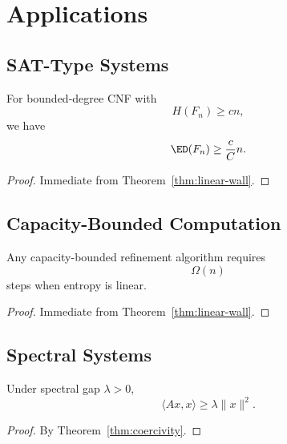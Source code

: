 \chapter{Applications}

\section{SAT-Type Systems}

\begin{theorem}
For bounded-degree CNF with
\[
H(F_n) \ge c n,
\]
we have
\[
\ED(F_n) \ge \frac{c}{C} n.
\]
\end{theorem}

\begin{proof}
Immediate from Theorem~\ref{thm:linear-wall}.
\end{proof}

\section{Capacity-Bounded Computation}

\begin{theorem}
Any capacity-bounded refinement algorithm requires
\[
\Omega(n)
\]
steps when entropy is linear.
\end{theorem}

\begin{proof}
Immediate from Theorem~\ref{thm:linear-wall}.
\end{proof}

\section{Spectral Systems}

\begin{theorem}
Under spectral gap $\lambda>0$,
\[
\langle Ax,x\rangle \ge \lambda \|x\|^2.
\]
\end{theorem}

\begin{proof}
By Theorem~\ref{thm:coercivity}.
\end{proof}
